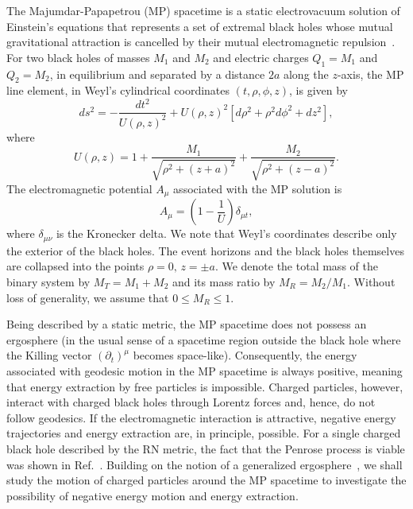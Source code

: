 The Majumdar-Papapetrou (MP) spacetime is a static electrovacuum solution of Einstein's equations that represents a set of extremal black holes whose mutual gravitational attraction is cancelled by their mutual electromagnetic repulsion~\cite{MAJUMDAR1947,PAPAPETROU1947,HARTLE1972}.
For two black holes of masses $M_1$ and $M_2$ and electric charges $Q_1=M_1$ and $Q_2=M_2$, in equilibrium and separated by a distance $2a$ along the $z$-axis, the MP line element, in Weyl's cylindrical coordinates $(t,\rho,\phi,z)$, is given by~\cite{SMERAK2016}
\begin{equation}
    d s^2 = - \frac{d t^2}{U(\rho,z)^{2}} + U(\rho,z)^2\left[d\rho^2 + \rho^2 d\phi^2 + d z^2\right],
    \label{eq:majumdar_papapetrou_line_element}
\end{equation}
%
where
\begin{equation}
    U(\rho,z) = 1 + \frac{M_1}{\sqrt{\rho^2 + (z+a)^2}} + \frac{M_2}{\sqrt{\rho^2 + (z-a)^2}}.
    \label{eq:mp_metric_potential_cylindric}
\end{equation}
The electromagnetic potential $A_\mu$ associated with the MP solution is
\begin{equation}
    A_\mu = \left(1 - \frac{1}{U}\right) \delta_{\mu t},
    \label{eq:electromagnetic_potential_mp}
\end{equation}
where $\delta_{\mu \nu}$ is the Kronecker delta. We note that Weyl's coordinates describe only the exterior of the black holes. The event horizons and the black holes themselves are collapsed into the points $\rho=0, \, z=\pm a$. We denote the total mass of the binary system by $M_T=M_1+M_2$ and its mass ratio by $M_R=M_2/M_1$. Without loss of generality, we assume that $0 \le M_R \le 1$.

Being described by a static metric, the MP spacetime does not possess an ergosphere (in the usual sense of a spacetime region outside the black hole where the Killing vector $(\partial_t)^\mu$ becomes space-like).
Consequently, the energy associated with geodesic motion in the MP spacetime is always positive, meaning that energy extraction by free particles is impossible. Charged particles, however, interact with charged black holes through Lorentz forces and, hence, do not follow geodesics.
If the electromagnetic interaction is attractive, negative energy trajectories and energy extraction are, in principle, possible. For a single charged black hole described by the RN metric, the fact that the Penrose process is viable was shown in Ref.~\cite{DENARDO1973}. Building on the notion of a generalized ergosphere~\cite{RUFFINI1971,DENARDO1973}, we shall study the motion of charged particles around the MP spacetime to investigate the possibility of negative energy motion and energy extraction.

